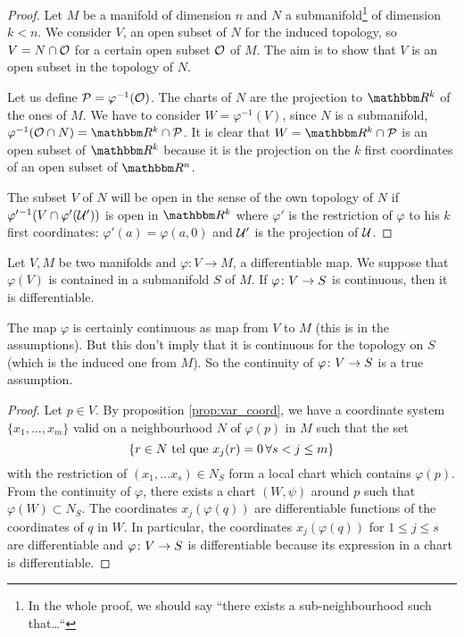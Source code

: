 \begin{proof}
Let $M$ be a manifold of dimension $n$ and $N$ a submanifold\footnote{In the whole proof, we should say ``there exists a sub-neighbourhood such that\ldots``} of dimension $k<n$. We consider $V$, an open subset of $N$ for the induced topology, so $V=N\cap\mathcal{O}$ for a certain open subset $\mathcal{O}$ of $M$. The aim is to show that $V$ is an open subset in the topology of $N$. 

Let us define $\mathcal{P}=\varphi^{-1}(\mathcal{O})$.  The charts of $N$ are the projection to $\eR^k$ of the ones of $M$. We have to consider $W=\varphi^{-1}(V)$, since $N$ is a submanifold, $\varphi^{-1}(\mO\cap N)=\eR^k\cap\mP$. It is clear that $W=\eR^k\cap\mP$ is an open subset of $\eR^k$ because it is the projection on the $k$ first coordinates of an open subset of $\eR^n$.

The subset $V$ of $N$ will be open in the sense of the own topology of $N$ if $\varphi'{}^{-1}(V\cap\varphi'(\mathcal{U}'))$ is open in $\eR^k$ where $\varphi'$ is the restriction of $\varphi$ to his $k$ first coordinates: $\varphi'(a)=\varphi(a,0)$ and $\mathcal{U}'$ is the projection of $\mathcal{U}$.
\end{proof}


\begin{lemma}
Let $V,M$ be two manifolds and $\varphi\colon V\to M$, a differentiable map. We suppose that $\varphi(V)$ is contained in a submanifold $S$ of $M$. If $\varphi\colon V\to S$ is continuous, then it is differentiable.
\label{lem:var_cont_diff}
\end{lemma}

\begin{remark}
The map $\varphi$ is certainly continuous as map from $V$ to $M$ (this is in the assumptions). But this don't imply that it is continuous for the topology on $S$ (which is the induced one from $M$). So the continuity of $\varphi\colon V\to S$ is a true assumption.
\end{remark}

\begin{proof}
Let $p\in V$. By proposition \ref{prop:var_coord}, we have  a coordinate system $\{x_1,\ldots,x_m\}$ valid on a neighbourhood $N$ of $\varphi(p)$ in $M$ such that the set 
\[
  \{r\in N\text{ tel que } x_j(r)=0\, \forall s<j\leq m  \}
\]
with the restriction of $(x_1,\ldots x_s)\in N_S$ form a local chart which contains $\varphi(p)$. From the continuity of $\varphi$, there exists a chart $(W,\psi)$ around $p$ such that $\varphi(W)\subset N_S$. The coordinates $x_j(\varphi(q))$ are differentiable functions of  the coordinates of $q$ in $W$. In particular, the coordinates $x_j(\varphi(q))$ for $1\leq j\leq s$ are differentiable and $\varphi\colon V\to S$ is differentiable because its expression in a chart is differentiable.
\end{proof}


